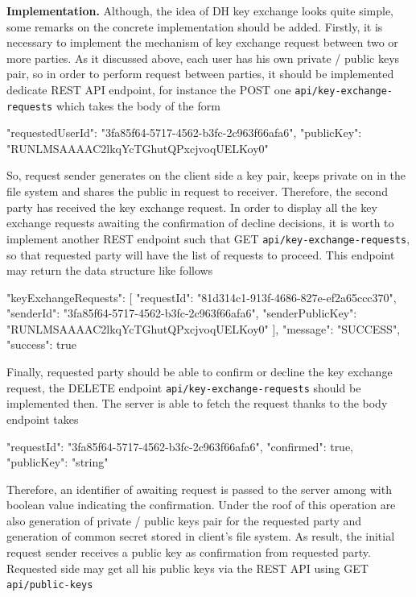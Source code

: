 \textbf{Implementation.} Although, the idea of DH key exchange looks quite simple, some remarks on the concrete
implementation should be added.
Firstly, it is necessary to implement the mechanism of key exchange request between two or more parties.
As it discussed above, each user has his own private / public keys pair, so in order to perform request between parties,
it should be implemented dedicate REST API endpoint, for instance the POST one \texttt{api/key-exchange-requests} which
takes the body of the form
\begin{spverbatim}
{
    "requestedUserId": "3fa85f64-5717-4562-b3fc-2c963f66afa6",
    "publicKey": "RUNLMSAAAAC2lkqYcTGhutQPxcjvoqUELKoy0"
}
\end{spverbatim}
So, request sender generates on the client side a key pair, keeps private on in the file system and shares the public
in request to receiver.
Therefore, the second party has received the key exchange request.
In order to display all the key exchange requests awaiting the confirmation of decline decisions, it is worth to implement
another REST endpoint such that GET \texttt{api/key-exchange-requests}, so that requested party will have the list of
requests to proceed.
This endpoint may return the data structure like follows
\begin{spverbatim}
{
    "keyExchangeRequests": [
        {
            "requestId": "81d314c1-913f-4686-827e-ef2a65ccc370",
            "senderId": "3fa85f64-5717-4562-b3fc-2c963f66afa6",
            "senderPublicKey": "RUNLMSAAAAC2lkqYcTGhutQPxcjvoqUELKoy0"
        }
    ],
    "message": "SUCCESS",
    "success": true
}
\end{spverbatim}
Finally, requested party should be able to confirm or decline the key exchange request, the DELETE endpoint
\texttt{api/key-exchange-requests} should be implemented then.
The server is able to fetch the request thanks to the body endpoint takes
\begin{spverbatim}
{
    "requestId": "3fa85f64-5717-4562-b3fc-2c963f66afa6",
    "confirmed": true,
    "publicKey": "string"
}
\end{spverbatim}
Therefore, an identifier of awaiting request is passed to the server among with boolean value
indicating the confirmation.
Under the roof of this operation are also generation of private / public keys pair for the requested party and
generation of common secret stored in client's file system.
As result, the initial request sender receives a public key as confirmation from requested party.
Requested side may get all his public keys via the REST API using GET \texttt{api/public-keys}
